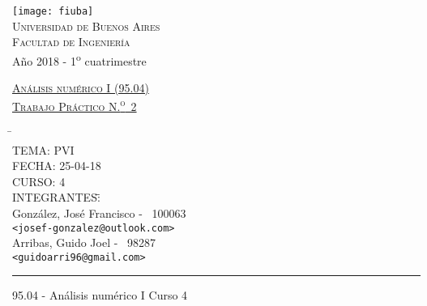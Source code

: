 \documentclass[a4paper, 10pt, spanish]{article}
\newcommand{\Nro}{N.\textsuperscript{o}\xspace}
\begin{document}
\marginsize{2cm}{2cm}{2cm}{2cm}
%
%
\begin{titlepage}

\thispagestyle{empty}

\begin{center}
\texttt{[image: fiuba]}\\
\large{\textsc{Universidad de Buenos Aires}}\\
\large{\textsc{Facultad de Ingeniería}}\\
\small{Año 2018 - 1\textsuperscript{o} cuatrimestre}
\end{center}

\vfill

\begin{center} %
\Large{\underline{\textsc{Análisis numérico I (95.04)}}}\\ \vspace{0.5cm}
\Large{\underline{\textsc{Trabajo Práctico \Nro~2}}}
\end{center}

\vfill

\begin{tabbing}
\hspace{2cm}\=\+\\
	TEMA: PVI\\
	FECHA: 25-04-18\\%
    CURSO: 4
\\
	INTEGRANTES:\hspace{-1cm}\=\+\hspace{1cm}\=\hspace{6cm}\=\\
		González, José Francisco	\>\>- \ 100063\\
			\>\footnotesize{\verb!<josef-gonzalez@outlook.com>!}\\
		Arribas, Guido Joel	\>\>- \ 98287\\
			\>\footnotesize{\verb!<guidoarri96@gmail.com>!}\\
		

\end{tabbing}

\vfill

\hrule
\vspace{0.2cm}

\noindent\small{95.04 - Análisis numérico I \hfill Curso 4}

\end{titlepage}
\end{document}
